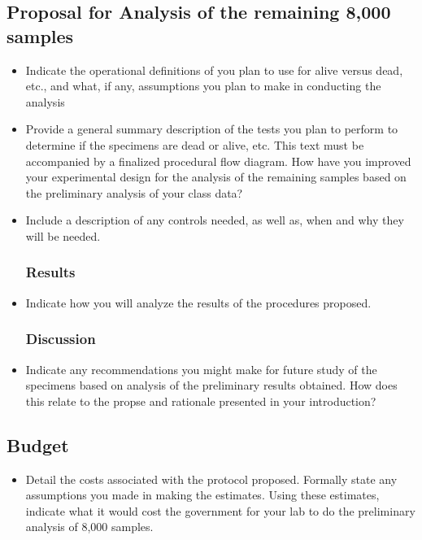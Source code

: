 \documentclass[12pt,a4paper]{article}
\begin{document}
\subsection*{Proposal for Analysis of the remaining 8,000 samples}
\begin{itemize}
\subsubsection*{Materials and Methods}
\item Indicate the operational definitions of you plan to use for alive versus dead, etc., and what, if any, assumptions you plan to make in conducting the analysis
\item Provide a general summary description of the test{s} you plan to perform to determine if the specimens are dead or alive, etc. This text must be accompanied by a finalized procedural flow diagram.  How have you improved your experimental design for the analysis of the remaining samples based on the preliminary analysis of your class data?
\item Include a description of any controls needed, as well as, when and why they will be needed.%
\subsubsection*{Results}%
\item Indicate how you will analyze the results of the procedures proposed.%
\subsubsection*{Discussion}%
\item Indicate any recommendations you might make for future study of the specimens based on analysis of the preliminary results obtained. How does this relate to the propse and rationale presented in your introduction?
\end{itemize}
\subsection*{Budget}
\begin{itemize}
\item Detail the costs associated with the protocol proposed. Formally state any assumptions you made in making the estimates. Using these estimates, indicate what it would cost the government for your lab to do the preliminary analysis of 8,000 samples.
\end{itemize}
\end{document}
